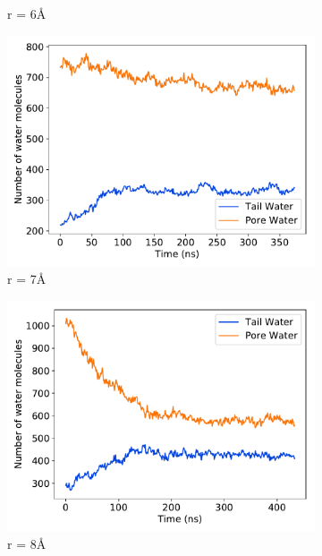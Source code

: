 \documentclass{article}
\begin{document}
\begin{figure}[!htb]
\begin{subfigure}{0.45\textwidth}
  \caption{r = 6\AA}\label{fig:r6_gap}
  \end{subfigure}
  \begin{subfigure}{0.45\textwidth}
  \includegraphics[width=\linewidth]{r7_gap.pdf}
  \caption{r = 7\AA}\label{fig:r7_gap}
  \end{subfigure}
  \begin{subfigure}{0.45\textwidth}
  \includegraphics[width=\linewidth]{r8_gap.pdf}
  \caption{r = 8\AA}\label{fig:r8_gap}
  \end{subfigure}
  \caption{}\label{fig:gap_prefilled_equil}
  \end{figure}
\end{document}
